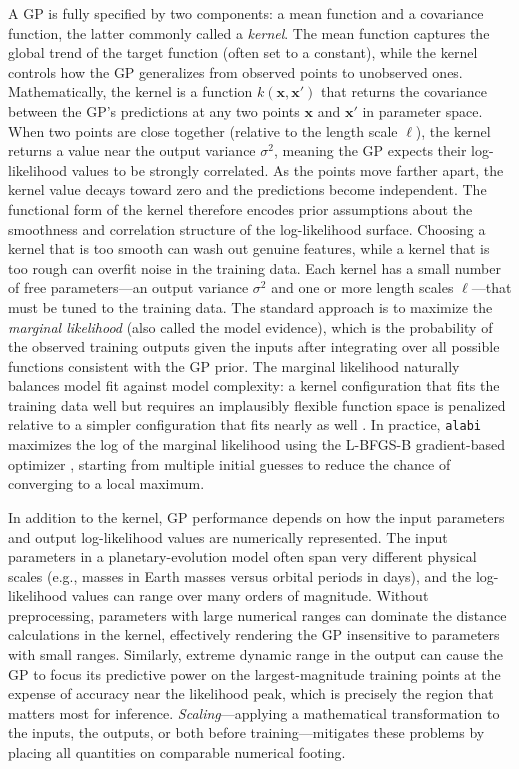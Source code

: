 A GP is fully specified by two components: a mean function and a
covariance function, the latter commonly called a \emph{kernel}. The
mean function captures the global trend of the target function (often
set to a constant), while the kernel controls how the GP generalizes
from observed points to unobserved ones. Mathematically, the kernel is a function
$k(\mathbf{x}, \mathbf{x}')$ that returns the covariance between the
GP's predictions at any two points $\mathbf{x}$ and $\mathbf{x}'$ in
parameter space. When two points are close together (relative to the
length scale $\ell$), the kernel returns a value near the output
variance $\sigma^{2}$, meaning the GP expects their log-likelihood
values to be strongly correlated. As the points move farther apart,
the kernel value decays toward zero and the predictions become
independent. The functional form of the kernel
therefore encodes prior assumptions about the smoothness and
correlation structure of the log-likelihood surface. Choosing a kernel
that is too smooth can wash out genuine features, while a kernel that
is too rough can overfit noise in the training data. Each kernel has a small number of free parameters---an output
variance $\sigma^{2}$ and one or more length scales $\ell$---that
must be tuned to the training data. The standard approach is to
maximize the \emph{marginal likelihood} (also called the model
evidence), which is the probability of the observed training outputs
given the inputs after integrating over all possible functions
consistent with the GP prior. The marginal likelihood naturally
balances model fit against model complexity: a kernel configuration
that fits the training data well but requires an implausibly flexible
function space is penalized relative to a simpler configuration that
fits nearly as well \citep{Rasmussen2006}. In practice,
\texttt{alabi} maximizes the log of the marginal likelihood using the
L-BFGS-B gradient-based optimizer \citep{Byrd1995}, starting from
multiple initial guesses to reduce the chance of converging to a local
maximum.

In addition to the kernel, GP performance depends on how the input
parameters and output log-likelihood values are numerically
represented. The input parameters in a planetary-evolution model often
span very different physical scales (e.g., masses in Earth masses
versus orbital periods in days), and the log-likelihood values can
range over many orders of magnitude. Without preprocessing, parameters
with large numerical ranges can dominate the distance calculations in
the kernel, effectively rendering the GP insensitive to parameters
with small ranges. Similarly, extreme dynamic range in the output can
cause the GP to focus its predictive power on the largest-magnitude
training points at the expense of accuracy near the likelihood peak,
which is precisely the region that matters most for inference.
\emph{Scaling}---applying a mathematical transformation to the inputs,
the outputs, or both before training---mitigates these problems by
placing all quantities on comparable numerical footing.

